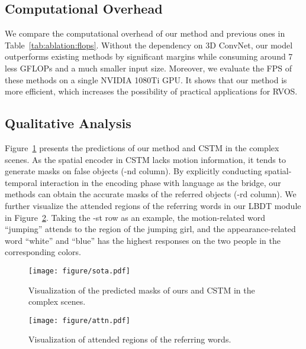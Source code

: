 \documentclass[10pt,twocolumn,letterpaper]{article}
\begin{document}
\subsection{Computational Overhead}
We compare the computational overhead of our method and previous ones in Table~\ref{tab:ablation:flops}. Without the dependency on 3D ConvNet, our model outperforms existing methods by significant margins while consuming around 7 less GFLOPs and a much smaller input size. Moreover, we evaluate the FPS of these methods on a single NVIDIA 1080Ti GPU. It shows that our method is more efficient, which increases the possibility of practical applications for RVOS.

\subsection{Qualitative Analysis}
\label{exp:visualize}



Figure~\ref{fig:sota} presents the predictions of our method and CSTM \cite{HuiH0DLWH021} in the complex scenes. As the spatial encoder in CSTM lacks motion information, it tends to generate masks on false objects (-nd column). By explicitly conducting spatial-temporal interaction in the encoding phase with language as the bridge, our methods can obtain the accurate masks of the referred objects (-rd column).
We further visualize the attended regions of the referring words in our LBDT module in Figure~\ref{fig:attn}. Taking the -st row as an example, the motion-related word ``jumping'' attends to the region of the jumping girl, and the appearance-related word ``white'' and ``blue'' has the highest responses on the two people in the corresponding colors. 

\begin{figure}[t]
	\centering
		\texttt{[image: figure/sota.pdf]}
	\caption{Visualization of the predicted masks of ours and CSTM \cite{HuiH0DLWH021} in the complex scenes.}
    
	\label{fig:sota}
	
\end{figure}

\begin{figure}[t]
	\centering
		\texttt{[image: figure/attn.pdf]}
	\caption{Visualization of attended regions of the referring words.}

	\label{fig:attn}
	
\end{figure}
\end{document}
